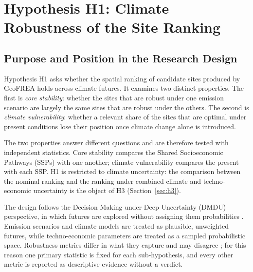 
\section{Hypothesis H1: Climate Robustness of the Site Ranking}
\label{sec:h1}

\subsection{Purpose and Position in the Research Design}
\label{subsec:h1_purpose}

Hypothesis H1 asks whether the spatial ranking of candidate sites produced by
GeoFREA holds across climate futures. It examines two distinct properties.
The first is \textit{core stability}: whether the sites that are robust under
one emission scenario are largely the same sites that are robust under the
others. The second is \textit{climate vulnerability}: whether a relevant share
of the sites that are optimal under present conditions lose their position once
climate change alone is introduced.

The two properties answer different questions and are therefore tested with
independent statistics. Core stability compares the Shared Socioeconomic
Pathways (SSPs) with one another; climate vulnerability compares the present
with each SSP. H1 is restricted to climate uncertainty: the comparison between
the nominal ranking and the ranking under combined climate and
techno-economic uncertainty is the object of H3
(Section~\ref{sec:h3}).

The design follows the Decision Making under Deep Uncertainty (DMDU)
perspective, in which futures are explored without assigning them probabilities
\cite{lempert2003,marchau2019}. Emission scenarios and climate models are
treated as plausible, unweighted futures, while techno-economic parameters are
treated as a sampled probabilistic space. Robustness metrics differ in what they
capture and may disagree \cite{herman2015,kwakkel2016,mcphail2018}; for this
reason one primary statistic is fixed for each sub-hypothesis, and every other
metric is reported as descriptive evidence without a verdict.


